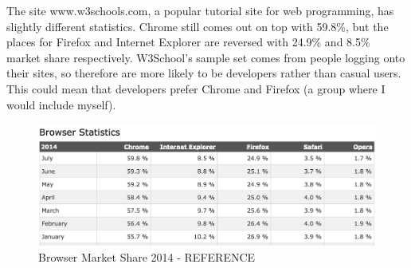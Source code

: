 \documentclass[a4paper,11pt,twoside]{article}
\begin{document}
The site www.w3schools.com, a popular tutorial site for web programming, has slightly different statistics. Chrome still comes out on top with 59.8\%, but the places for Firefox and Internet Explorer are reversed with 24.9\% and 8.5\% market share respectively. W3School's sample set comes from people logging onto their sites, so therefore are more likely to be developers rather than casual users. This could mean that developers prefer Chrome and Firefox (a group where I would include myself).

\begin{figure}[ht!]
\centering
\includegraphics[width=165mm]{graphics/webStats_01b.png}
\caption{Browser Market Share 2014 - REFERENCE}
\label{fig:UIdesign1}
\end{figure}
\end{document}
